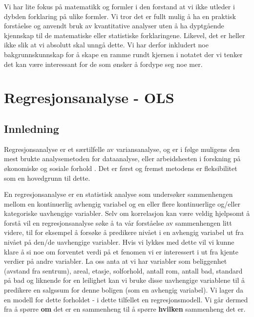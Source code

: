 \documentclass[
]{article}
\begin{document}
Vi har lite fokus på matematikk og formler i den forstand at vi ikke utleder i dybden forklaring på ulike formler. Vi tror det er fullt mulig å ha en praktisk forståelse og anvendt bruk av kvantitative analyser uten å ha dyptgående kjennskap til de matematiske eller statistiske forklaringene. Likevel, det er heller ikke slik at vi absolutt skal unngå dette. Vi har derfor inkludert noe bakgrunnskunnskap for å skape en
ramme rundt kjernen i notatet der vi tenker det kan være interessant for de som ønsker å fordype seg noe mer.

\hypertarget{regresjonsanalyse---ols}{%
\section{Regresjonsanalyse - OLS}\label{regresjonsanalyse---ols}}

\hypertarget{innledning}{%
\subsection{Innledning}\label{innledning}}

Regresjonsanalyse er et særtilfelle av variansanalyse, og er i følge \citet{mehmetogluInnforingStatistiskeDataanalyser2020} muligens den mest brukte analysemetoden for dataanalyse, eller arbeidshesten i forskning på økonomiske og sosiale forhold \citep{thraneAppliedRegressionAnalysis2019}. Det er først og fremst metodens er fleksibilitet som en hovedgrunn til dette.

En regresjonsanalyse er en statistisk analyse som undersøker sammenhengen mellom en kontinuerlig avhengig variabel og en eller flere kontinuerlige og/eller kategoriske uavhengige variabler. Selv om korrelasjon kan være veldig hjelpsomt å forstå vil en regresjonsanalyse søke å ta vår forståelse av sammenhengen litt videre, til for eksempel å forsøke å predikere nivået i en avhengig variabel ut fra nivået på den/de uavhengige variabler. Hvis vi lykkes med dette vil vi kunne klare å si noe om forventet verdi på et fenomen vi er interessert i ut fra kjente verdier på andre variabler. La oss anta at vi har variabler som beliggenhet (avstand fra sentrum), areal, etasje, solforhold, antall rom, antall bad, standard på bad og liknende for en leilighet kan vi bruke disse uavhengige variablene til å predikere en salgssum for denne boligen (som en avhengig variabel). Vi lager da en modell for dette forholdet - i dette tilfellet en regresjonsmodell. Vi går dermed fra å spørre \textbf{om} det er en sammenheng til å spørre \textbf{hvilken} sammenheng det er.
\end{document}
